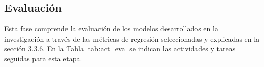 		
		
		

		\subsection{Evaluación}
		Esta fase comprende la evaluación de los modelos desarrollados en la investigación a través de las métricas de regresión seleccionadas y explicadas en la sección 3.3.6. En la Tabla \ref{tab:act_eva} se indican las actividades y tareas seguidas para esta etapa.
		
